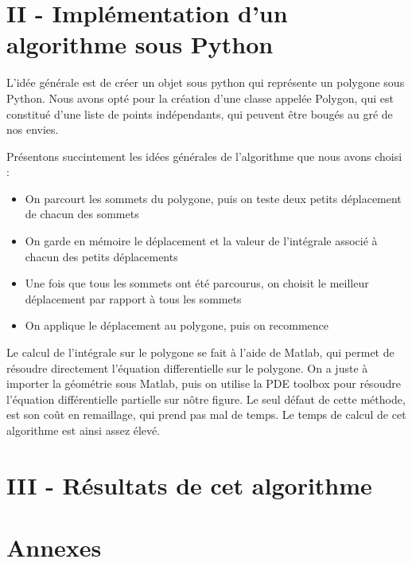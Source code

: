 \documentclass[a4paper,reqno]{article}
\newcommand{\pa}{\hspace{0.5cm}}
\begin{document}
\section*{II - Implémentation d'un algorithme sous Python} 
\pa L'idée générale est de créer un objet sous python qui représente un polygone sous Python. Nous avons opté pour la création d'une classe appelée Polygon, qui est constitué d'une liste de points indépendants, qui peuvent être bougés au gré de nos envies. 
\par Présentons succintement les idées générales de l'algorithme que nous avons choisi : \vspace{0.3cm}

\begin{itemize}
  \item On parcourt les sommets du polygone, puis on teste deux petits déplacement de chacun des sommets
  \item On garde en mémoire le déplacement et la valeur de l'intégrale associé à chacun des petits déplacements
  \item Une fois que tous les sommets ont été parcourus, on choisit le meilleur déplacement par rapport à tous les sommets
  \item On applique le déplacement au polygone, puis on recommence 
\end{itemize}
\vspace{0.3cm}
Le calcul de l'intégrale sur le polygone se fait à l'aide de Matlab, qui permet de résoudre directement l'équation differentielle sur le polygone. On a juste à importer la géométrie sous Matlab, puis on utilise la PDE toolbox pour résoudre l'équation différentielle partielle sur nôtre figure. Le seul défaut de cette méthode, est son coût en remaillage, qui prend pas mal de temps. Le temps de calcul de cet algorithme est ainsi assez élevé. 
\par 


\newpage
\section*{III - Résultats de cet algorithme }

\newpage

\pa 






\section*{Annexes}
\end{document}
